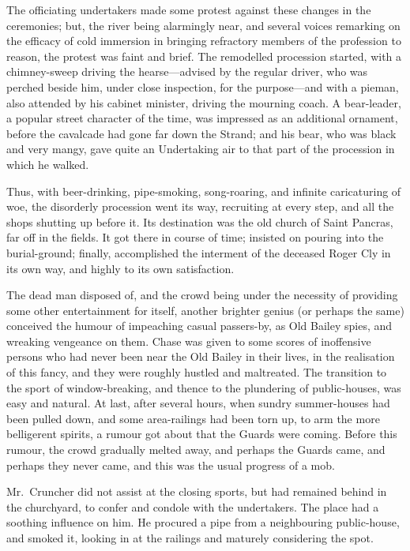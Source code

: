 The officiating undertakers made some protest against these changes
in the ceremonies; but, the river being alarmingly near, and several
voices remarking on the efficacy of cold immersion in bringing
refractory members of the profession to reason, the protest was faint
and brief.  The remodelled procession started, with a chimney-sweep
driving the hearse---advised by the regular driver, who was perched
beside him, under close inspection, for the purpose---and with a pieman,
also attended by his cabinet minister, driving the mourning coach.
A bear-leader, a popular street character of the time, was impressed
as an additional ornament, before the cavalcade had gone far down
the Strand; and his bear, who was black and very mangy, gave quite
an Undertaking air to that part of the procession in which he walked.

Thus, with beer-drinking, pipe-smoking, song-roaring, and infinite
caricaturing of woe, the disorderly procession went its way, recruiting
at every step, and all the shops shutting up before it.  Its destination
was the old church of Saint Pancras, far off in the fields.  It got
there in course of time; insisted on pouring into the burial-ground;
finally, accomplished the interment of the deceased Roger Cly in
its own way, and highly to its own satisfaction.

The dead man disposed of, and the crowd being under the necessity of
providing some other entertainment for itself, another brighter genius
(or perhaps the same) conceived the humour of impeaching casual
passers-by, as Old Bailey spies, and wreaking vengeance on them.
Chase was given to some scores of inoffensive persons who had never
been near the Old Bailey in their lives, in the realisation of this
fancy, and they were roughly hustled and maltreated.  The transition
to the sport of window-breaking, and thence to the plundering of
public-houses, was easy and natural.  At last, after several hours,
when sundry summer-houses had been pulled down, and some area-railings
had been torn up, to arm the more belligerent spirits, a rumour got
about that the Guards were coming.  Before this rumour, the crowd
gradually melted away, and perhaps the Guards came, and perhaps they
never came, and this was the usual progress of a mob.

Mr.\ Cruncher did not assist at the closing sports, but had remained
behind in the churchyard, to confer and condole with the undertakers.
The place had a soothing influence on him.  He procured a pipe from a
neighbouring public-house, and smoked it, looking in at the railings
and maturely considering the spot.

